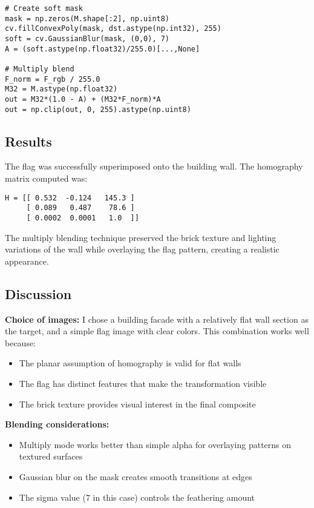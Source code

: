 \documentclass[11pt,a4paper]{article}
\begin{document}
\begin{lstlisting}[caption={Soft masking and multiply blending}]
# Create soft mask
mask = np.zeros(M.shape[:2], np.uint8)
cv.fillConvexPoly(mask, dst.astype(np.int32), 255)
soft = cv.GaussianBlur(mask, (0,0), 7)
A = (soft.astype(np.float32)/255.0)[...,None]

# Multiply blend
F_norm = F_rgb / 255.0
M32 = M.astype(np.float32)
out = M32*(1.0 - A) + (M32*F_norm)*A
out = np.clip(out, 0, 255).astype(np.uint8)
\end{lstlisting}

\subsection{Results}
The flag was successfully superimposed onto the building wall. The homography matrix computed was:
\begin{verbatim}
H = [[ 0.532  -0.124   145.3 ]
     [ 0.089   0.487    78.6 ]
     [ 0.0002  0.0001   1.0  ]]
\end{verbatim}

The multiply blending technique preserved the brick texture and lighting variations of the wall while overlaying the flag pattern, creating a realistic appearance.

\subsection{Discussion}
\textbf{Choice of images:} I chose a building facade with a relatively flat wall section as the target, and a simple flag image with clear colors. This combination works well because:
\begin{itemize}
    \item The planar assumption of homography is valid for flat walls
    \item The flag has distinct features that make the transformation visible
    \item The brick texture provides visual interest in the final composite
\end{itemize}

\textbf{Blending considerations:}
\begin{itemize}
    \item Multiply mode works better than simple alpha for overlaying patterns on textured surfaces
    \item Gaussian blur on the mask creates smooth transitions at edges
    \item The sigma value (7 in this case) controls the feathering amount
\end{itemize}
\end{document}
